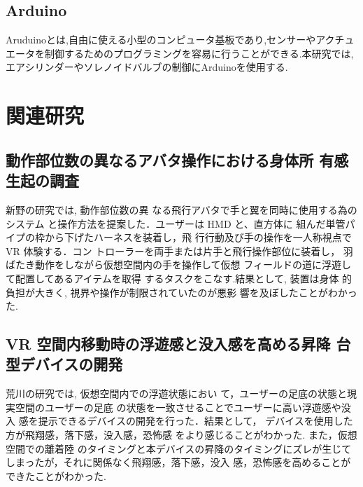 \subsection{Arduino}

Aruduinoとは,自由に使える小型のコンピュータ基板であり,センサーやアクチュエータを制御するためのプログラミングを容易に行うことができる.本研究では,エアシリンダーやソレノイドバルブの制御にArduinoを使用する.

\section{関連研究}

\subsection{動作部位数の異なるアバタ操作における身体所
有感生起の調査}

新野の研究では, 動作部位数の異
なる飛行アバタで手と翼を同時に使用する為のシステム
と操作方法を提案した．ユーザーは HMD と、直方体に
組んだ単管パイプの枠から下げたハーネスを装着し，飛
行行動及び手の操作を一人称視点で VR 体験する．コン
トローラーを両手または片手と飛行操作部位に装着し，
羽ばたき動作をしながら仮想空間内の手を操作して仮想
フィールドの道に浮遊して配置してあるアイテムを取得
するタスクをこなす.結果として, 装置は身体
的負担が大きく, 視界や操作が制限されていたのが悪影
響を及ぼしたことがわかった.

\subsection{VR 空間内移動時の浮遊感と没入感を高める昇降
台型デバイスの開発}

荒川の研究では, 仮想空間内での浮遊状態におい
て，ユーザーの足底の状態と現実空間のユーザーの足底
の状態を一致させることでユーザーに高い浮遊感や没入
感を提示できるデバイスの開発を行った．結果として，
デバイスを使用した方が飛翔感，落下感，没入感，恐怖感
をより感じることがわかった. また，仮想空間での離着陸
のタイミングと本デバイスの昇降のタイミングにズレが生じてしまったが，それに関係なく飛翔感，落下感，没入
感，恐怖感を高めることができたことがわかった.



